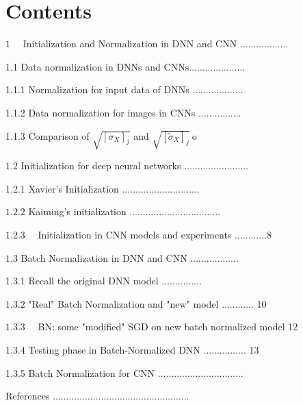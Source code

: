 \documentclass[10pt]{article}
\begin{document}
\section{Contents}
$1 \quad$ Initialization and Normalization in DNN and CNN $\ldots \ldots \ldots \ldots \ldots \ldots$

1.1 Data normalization in DNNs and $\mathrm{CNNs} \ldots \ldots \ldots \ldots \ldots \ldots \ldots$

1.1.1 Normalization for input data of DNNs ...................

1.1.2 Data normalization for images in CNNs $\ldots \ldots \ldots \ldots \ldots .$

1.1.3 Comparison of $\sqrt{\left[\sigma_{X}\right]_{j}}$ and $\sqrt{\left[\tilde{\sigma}_{X}\right]_{j}} \mathrm{~ o}$

$1.2$ Initialization for deep neural networks $\ldots \ldots \ldots \ldots \ldots \ldots \ldots \ldots$

1.2.1 Xavier's Initialization $\ldots \ldots \ldots \ldots \ldots . . . . . . . . . . . . . .$

$1.2 .2$ Kaiming's initialization $\ldots \ldots \ldots \ldots \ldots \ldots \ldots \ldots \ldots . . . . . . .$

$1.2 .3 \quad$ Initialization in CNN models and experiments $\ldots \ldots \ldots . . .8$

$1.3$ Batch Normalization in DNN and CNN $\ldots \ldots \ldots \ldots \ldots \ldots$

1.3.1 Recall the original DNN model $\ldots \ldots \ldots \ldots \ldots$

$1.3 .2$ "Real" Batch Normalization and "new" model ............ 10

$1.3 .3 \quad$ BN: some "modified" SGD on new batch normalized model 12

1.3.4 Testing phase in Batch-Normalized DNN ................ 13

1.3.5 Batch Normalization for CNN $\ldots \ldots \ldots \ldots \ldots . . . . . . . . . . . . . . . . .$

References $\ldots \ldots \ldots \ldots \ldots \ldots \ldots \ldots \ldots \ldots \ldots \ldots \ldots \ldots \ldots \ldots \ldots$
\end{document}
